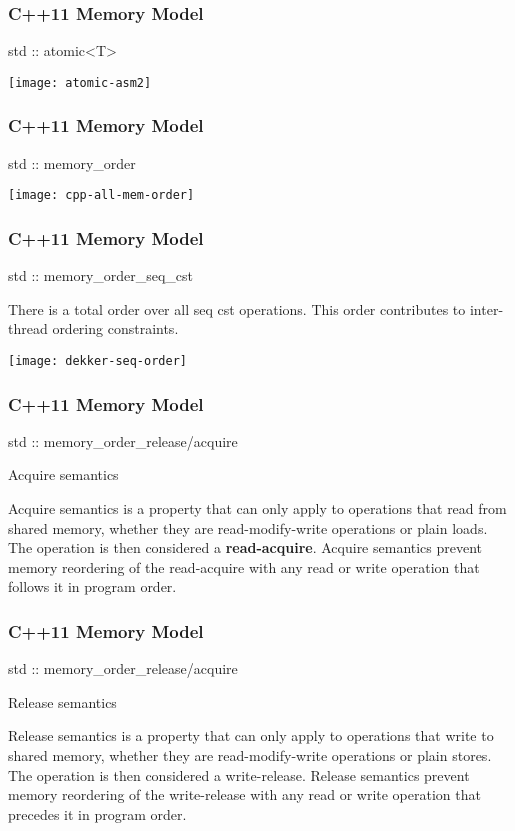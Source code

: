 \begin{frame}
    \frametitle{C++11 Memory Model}
    \LARGE
    std :: atomic<T>
    
    \texttt{[image: atomic-asm2]}
\end{frame}
\begin{frame}
    \frametitle{C++11 Memory Model}
    \LARGE
    std :: memory\_order
    
    \texttt{[image: cpp-all-mem-order]}
\end{frame}


\begin{frame}
    \frametitle{C++11 Memory Model}
    \LARGE
    std :: memory\_order\_seq\_cst
    
    \normalsize
    There is a total order over all seq cst operations. This order
    contributes to inter-thread ordering constraints.
    
    \texttt{[image: dekker-seq-order]}
\end{frame}

\begin{frame}
    \frametitle{C++11 Memory Model}
    \LARGE
    std :: memory\_order\_release/acquire
    
    \large
\begin{block}{Acquire semantics}
    
Acquire semantics is a property that can only apply to operations that read from shared memory, whether they are read-modify-write operations or plain loads. The operation is then considered a \textbf{read-acquire}. Acquire semantics prevent memory reordering of the read-acquire with any read or write operation that follows it in program order.
\end{block}
\end{frame}

\begin{frame}
    \frametitle{C++11 Memory Model}
    \LARGE
    std :: memory\_order\_release/acquire
    
    \large
    \begin{block}{Release semantics}
        
Release semantics is a property that can only apply to operations that write to shared memory, whether they are read-modify-write operations or plain stores. The operation is then considered a write-release. Release semantics prevent memory reordering of the write-release with any read or write operation that precedes it in program order.
    \end{block}
\end{frame}


